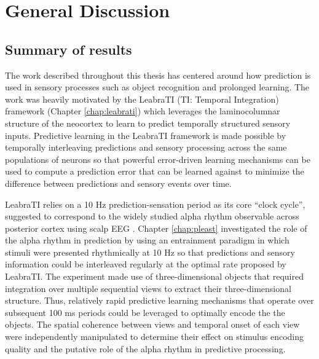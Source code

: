\documentclass[dwyatte_dissertation.tex]{subfiles}
\begin{document}
\sloppy

\chapter{General Discussion}
\section{Summary of results}
The work described throughout this thesis has centered around how prediction is used in sensory processes such as object recognition and prolonged learning. The work was heavily motivated by the LeabraTI (TI: Temporal Integration) framework (Chapter \ref{chap:leabrati}) which leverages the laminocolumnar structure of the neocortex \cite{Mountcastle97,BuxhoevedenCasanova02,HortonAdams05} to learn to predict temporally structured sensory inputs. Predictive learning in the LeabraTI framework is made possible by temporally interleaving predictions and sensory processing across the same populations of neurons so that powerful error-driven learning mechanisms \cite{OReillyMunakata00,OReillyMunakataFrankEtAl12} can be used to compute a prediction error that can be learned against to minimize the difference between predictions and sensory events over time.

LeabraTI relies on a 10 Hz prediction-sensation period as its core ``clock cycle'', suggested to correspond to the widely studied alpha rhythm observable across posterior cortex using scalp EEG \cite{PalvaPalva07,HanslmayrGrossKlimeschEtAl11,VanRullenBuschDrewesEtAl11}. Chapter \ref{chap:pleast} investigated the role of the alpha rhythm in prediction by using an entrainment paradigm \cite{SchroederLakatosKajikawaEtAl08,CalderoneLakatosButlerEtAlInPress} in which stimuli were presented rhythmically at 10 Hz so that predictions and sensory information could be interleaved regularly at the optimal rate proposed by LeabraTI. The experiment made use of three-dimensional objects that required integration over multiple sequential views to extract their three-dimensional structure. Thus, relatively rapid predictive learning mechanisms that operate over subsequent 100 ms periods could be leveraged to optimally encode the the objects. The spatial coherence between views and temporal onset of each view were independently manipulated to determine their effect on stimulus encoding quality and the putative role of the alpha rhythm in predictive processing.
\end{document}
